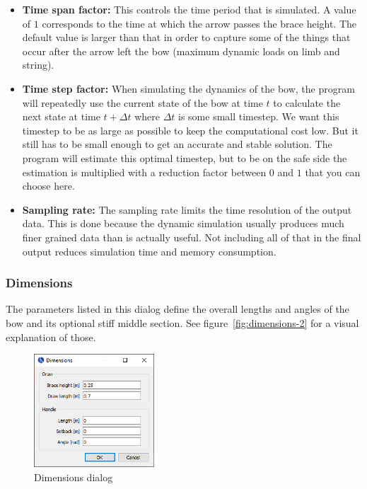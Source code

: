 \documentclass[12pt]{article}
\begin{document}
\begin{itemize}
\item \textbf{Time span factor:} This controls the time period that is simulated. A value of $1$ corresponds to the time at which the arrow passes the brace height. The default value is larger than that in order to capture some of the things that occur after the arrow left the bow (maximum dynamic loads on limb and string).
\item \textbf{Time step factor:} When simulating the dynamics of the bow, the program will repeatedly use the current state of the bow at time $t$ to calculate the next state at time $t + \Delta t$ where $\Delta t$ is some small timestep. We want this timestep to be as large as possible to keep the computational cost low. But it still has to be small enough to get an accurate and stable solution. The program will estimate this optimal timestep, but to be on the safe side the estimation is multiplied with a reduction factor between $0$ and $1$ that you can choose here.
\item \textbf{Sampling rate:} The sampling rate limits the time resolution of the output data. This is done because the dynamic simulation usually produces much finer grained data than is actually useful. Not including all of that in the final output reduces simulation time and memory consumption.
\end{itemize}

\newpage
\subsubsection{Dimensions}
\label{sec:dimensions}

The parameters listed in this dialog define the overall lengths and angles of the bow and its optional stiff middle section. See figure~\ref{fig:dimensions-2} for a visual explanation of those.
\bigskip

\begin{figure}[H]
\centering
\includegraphics[width=0.4\textwidth]{figures/screenshots/input/dimensions}
\caption{Dimensions dialog}
\label{fig:dimensions-1}
\end{figure}
\end{document}
